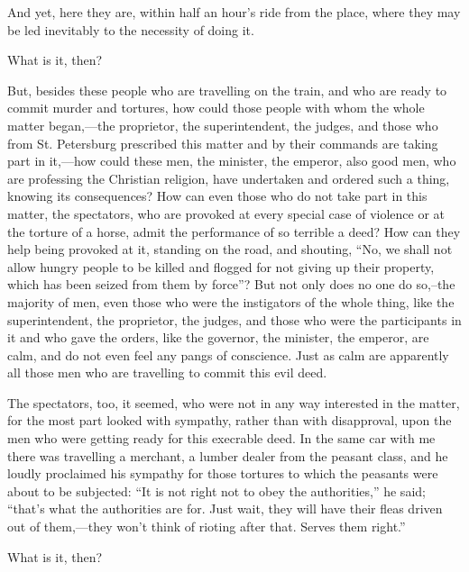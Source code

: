 \documentclass{book}
\begin{document}
And yet, here they are, within half an hour’s ride from the place, where they may be led inevitably to the necessity of doing it.

What is it, then?

But, besides these people who are travelling on the train, and who are ready to commit murder and tortures, how could those people with whom the whole matter began,—the proprietor, the superintendent, the judges, and those who from St. Petersburg prescribed this matter and by their commands are taking part in it,—how could these men, the minister, the emperor, also good men, who are professing the Christian religion, have undertaken and ordered such a thing, knowing its consequences? How can even those who do not take part in this matter, the spectators, who are provoked at every special case of violence or at the torture of a horse, admit the performance of so terrible a deed? How can they help being provoked at it, standing on the road, and shouting, “No, we shall not allow hungry people to be killed and flogged for not giving up their property, which has been seized from them by force”? But not only does no one do so,–the majority of men, even those who were the instigators of the whole thing, like the superintendent, the proprietor, the judges, and those who were the participants in it and who gave the orders, like the governor, the minister, the emperor, are calm, and do not even feel any pangs of conscience. Just as calm are apparently all those men who are travelling to commit this evil deed.

The spectators, too, it seemed, who were not in any way interested in the matter, for the most part looked with sympathy, rather than with disapproval, upon the men who were getting ready for this execrable deed. In the same car with me there was travelling a merchant, a lumber dealer from the peasant class, and he loudly proclaimed his sympathy for those tortures to which the peasants were about to be subjected: “It is not right not to obey the authorities,” he said; “that’s what the authorities are for. Just wait, they will have their fleas driven out of them,—they won’t think of rioting after that. Serves them right.”

What is it, then?
\end{document}
